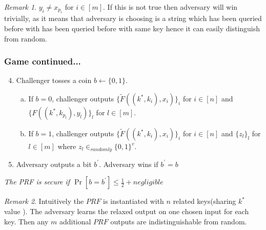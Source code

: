 \documentclass[hyperref={pdfpagelabels=false}]{beamer}
\theoremstyle{remark}
\newtheorem*{remark}{Remark}
\begin{document}
\begin{frame}

\begin{remark}
$y_i \neq x_{p_i}$ for $i \in \left[m\right]$. If this is not true then adversary will win trivially, as it means that adversary is choosing is a string which has been queried before with has been queried before with same key hence it can easily distinguish from random.
\end{remark}
\end{frame}
\begin{frame}
\frametitle{Game continued...}
\begin{enumerate}
\setcounter{enumi}{3}
\item Challenger tosses a coin $b \leftarrow \{0,1\}$.\pause
\begin{enumerate}[(a)]
\item If $b=0$, challenger outputs $\{\widetilde{F}((k^*,k_i),x_i)\}_i$ for $i \in \left[n\right]$ and $\{F((k^*,k_{p_l}),y_l)\}_l$ for $l \in \left[m\right]$.\pause
\item If $b=1$, challenger outputs $\{\widetilde{F}((k^*,k_i),x_i)\}_i$ for $i \in \left[n\right]$ and $\{z_l\}_l$ for $l \in \left[m\right]$ where $z_l \in_{randomly} \{0,1\}^v$.\pause
\end{enumerate}
\item Adversary outputs a bit $b^\prime$. Adversary wins if $b^\prime = b$\pause
\end{enumerate}
\textit{The PRF is secure if $\Pr\left[b=b^\prime\right] \leq \frac{1}{2} + negligible$} \pause
\begin{remark}
Intuitively the $PRF$ is instantiated with $n$ related keys(sharing $k^*$ value ). The adversary learns the relaxed output on one chosen input for each key. Then any $m$ additional $PRF$ outputs are indistinguishable from random.
\end{remark}
\end{frame}
\end{document}
